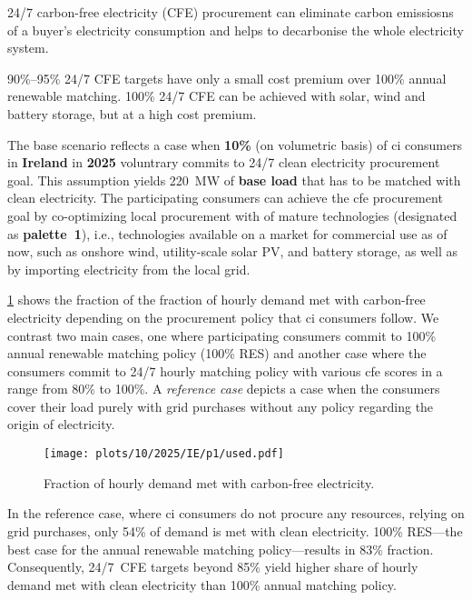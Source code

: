 \vspace{10pt}
\begin{res}
    24/7 carbon-free electricity (CFE) procurement can eliminate carbon emissiosns of a buyer's electricity consumption and helps to decarbonise the whole electricity system.
\end{res}

\vspace{5pt}
\begin{res}
    90\%--95\% 24/7 CFE targets have only a small cost premium over 100\% annual renewable matching. 100\% 24/7 CFE can be achieved with solar, wind and battery storage, but at a high cost premium.
\end{res}


The base scenario reflects a case when \textbf{10\%} (on volumetric basis) of \gls{ci} consumers in \textbf{Ireland} in \textbf{2025} voluntrary commits to 24/7 clean electricity procurement goal.
This assumption yields 220~MW of \textbf{base load} that has to be matched with clean electricity. 
The participating consumers can achieve the \gls{cfe} procurement goal by co-optimizing local procurement with of mature technologies (designated as \textbf{palette~1}), i.e., technologies available on a market for commercial use as of now, such as onshore wind, utility-scale solar PV, and battery storage, as well as by importing electricity from the local grid.

\cref{fig:10-2025-IE-p1-used} shows the fraction of the fraction of hourly demand met with carbon-free electricity depending on the procurement policy that \gls{ci} consumers follow.
We contrast two main cases, one where participating consumers commit to 100\% annual renewable matching policy (100\% RES) and another case where the consumers commit to 24/7 hourly matching policy with various \gls{cfe} scores in a range from 80\% to 100\%. 
A \textit{reference case} depicts a case when the consumers cover their load purely with grid purchases without any policy regarding the origin of electricity.

\begin{figure}
    \centering
    \texttt{[image: plots/10/2025/IE/p1/used.pdf]}
    \caption{Fraction of hourly demand met with carbon-free electricity.}
    \label{fig:10-2025-IE-p1-used}
\end{figure}

In the reference case, where \gls{ci} consumers do not procure any resources, relying on grid purchases, only 54\% of demand is met with clean electricity.
100\% RES---the best case for the annual renewable matching policy---results in 83\% fraction. 
Consequently, 24/7~CFE targets beyond 85\% yield higher share of hourly demand met with clean electricity than 100\% annual matching policy.

